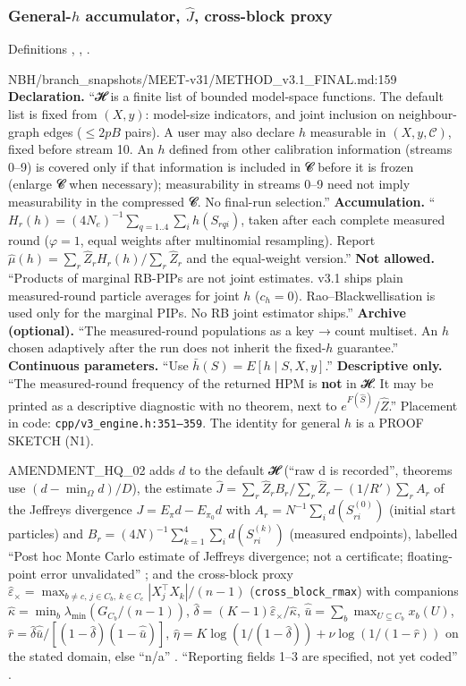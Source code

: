 \subsubsection{General-\texorpdfstring{$h$}{h} accumulator, \texorpdfstring{$\hat J$}{Jhat}, cross-block proxy}\label{sec:method-genh}
Definitions , , .
\begin{stmt}{NBH/branch_snapshots/MEET-v31/METHOD_v3.1_FINAL.md:159}
\textbf{Declaration.} ``𝓗 is a finite list of bounded model-space functions. The default list is fixed from $(X,y)$: model-size
indicators, and joint inclusion on neighbour-graph edges ($\le2pB$ pairs). A user may also declare $h$ measurable in $(X,y,\mathcal C)$,
fixed before stream 10. An $h$ defined from other calibration information (streams 0--9) is covered only if that information is
included in 𝓒 before it is frozen (enlarge 𝓒 when necessary); measurability in streams 0--9 need not imply measurability in the
compressed 𝓒. No final-run selection.'' \textbf{Accumulation.} ``$H_r(h)=(4N_e)^{-1}\sum_{q=1..4}\sum_ih(S_{rqi})$, taken after each complete
measured round ($\varphi=1$, equal weights after multinomial resampling). Report $\hat\mu(h)=\sum_r\hat Z_rH_r(h)/\sum_r\hat Z_r$ and the
equal-weight version.'' \textbf{Not allowed.} ``Products of marginal RB-PIPs are not joint estimates. v3.1 ships plain measured-round
particle averages for joint $h$ ($c_h=0$). Rao--Blackwellisation is used only for the marginal PIPs. No RB joint estimator ships.''
\textbf{Archive (optional).} ``The measured-round populations as a key → count multiset. An $h$ chosen adaptively after the run does not
inherit the fixed-$h$ guarantee.'' \textbf{Continuous parameters.} ``Use $\bar h(S)=E[h\mid S,X,y]$.'' \textbf{Descriptive only.} ``The
measured-round frequency of the returned HPM is \textbf{not} in 𝓗. It may be printed as a descriptive diagnostic with no theorem, next
to $e^{F(\hat S)}/\hat Z$.'' Placement in code: \texttt{cpp/v3\_engine.h:351--359}. The identity for general $h$ is a PROOF SKETCH (N1).
\end{stmt}
AMENDMENT\_HQ\_02 adds $d$ to the default 𝓗 (``raw d is recorded'', theorems use $(d-\min_\Omega d)/D$), the estimate
$\hat J=\sum_r\hat Z_rB_r/\sum_r\hat Z_r-(1/R')\sum_rA_r$ of the Jeffreys divergence $J=E_\pi d-E_{\pi_0}d$ with
$A_r=N^{-1}\sum_id(S^{(0)}_{ri})$ (initial start particles) and $B_r=(4N)^{-1}\sum_{k=1}^4\sum_id(S^{(k)}_{ri})$ (measured
endpoints), labelled ``Post hoc Monte Carlo estimate of Jeffreys divergence; not a certificate; floating-point error
unvalidated'' ; and the cross-block proxy
$\hat\varepsilon_\times=\max_{b\ne c,\,j\in C_b,\,k\in C_c}|X_j^\top X_k|/(n-1)$ (\texttt{cross\_block\_rmax}) with companions
$\hat\kappa=\min_b\lambda_{\min}(G_{C_b}/(n-1))$, $\hat\delta=(K-1)\hat\varepsilon_\times/\hat\kappa$, $\hat{\bar u}=\sum_b\max_{U\subseteq C_b}x_b(U)$,
$\hat r=\hat\delta\hat{\bar u}/[(1-\hat\delta)(1-\hat{\bar u})]$, $\hat\eta=K\log(1/(1-\hat\delta))+\nu\log(1/(1-\hat r))$ on the stated domain, else
``n/a'' . ``Reporting fields 1--3 are specified,
not yet coded'' .


